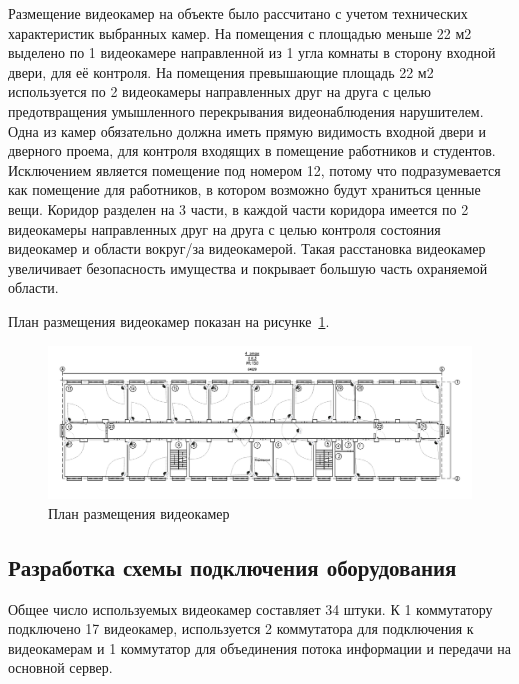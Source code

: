 Размещение видеокамер на объекте было рассчитано с учетом технических характеристик выбранных камер. 
На помещения с площадью меньше 22 м2 выделено по 1 видеокамере направленной из 1 угла комнаты в сторону входной двери, для её контроля. 
На помещения превышающие площадь 22 м2 используется по 2 видеокамеры направленных друг на друга с целью предотвращения умышленного 
перекрывания видеонаблюдения нарушителем. Одна из камер обязательно должна иметь прямую видимость входной двери и дверного проема, 
для контроля входящих в помещение работников и студентов. Исключением является помещение под номером 12, потому что подразумевается как 
помещение для работников, в котором возможно будут храниться ценные вещи. Коридор разделен на 3 части, в каждой части коридора имеется 
по 2 видеокамеры направленных друг на друга с целью контроля состояния видеокамер и области вокруг/за видеокамерой. Такая расстановка 
видеокамер увеличивает безопасность имущества и покрывает большую часть охраняемой области.

План размещения видеокамер показан на рисунке~\ref{fig::videocameras_placement}.

\begin{figure}
    \begin{center}
        \includegraphics[width=240mm]{images/План размещения видеокамер}
    \end{center}
    \captionsetup{justification=centering}
    \caption{План размещения видеокамер}
    \label{fig::videocameras_placement}
\end{figure}

\newpage


\subsection{Разработка схемы подключения оборудования}

Общее число используемых видеокамер составляет 34 штуки.
К 1 коммутатору подключено 17 видеокамер, используется 2 коммутатора для подключения к видеокамерам и 1 коммутатор для объединения
потока информации и передачи на основной сервер.

